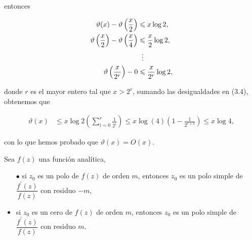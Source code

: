 entonces

\begin{equation}
    \begin{aligned}
 \vartheta(x)-\vartheta\left(\frac{x}{2}\right) &\leq x\log2, \\
 \vartheta\left(\frac{x}{2}\right) -\vartheta\left(\frac{x}{4}\right) &\leq \frac{x}{2}\log2,\\
 &\hspace*{0.191cm}\vdots \\
 \vartheta\left(\frac{x}{2^r}\right)-0 &\leq \frac{x}{2^r}\log 2,
\end{aligned}
\end{equation}

donde $r$ es el mayor entero tal que $x>2^r$, sumando las desigualdades en (3.4), obtenemos que

\begin{align*}
    \vartheta(x)&\leq x\log 2\left(\sum_{i=0}^{r} \frac{1}{2^{i}}\right)\leq x\log(4)\left(1-\frac{1}{2^{r+1}}\right)\leq x\log 4
,\end{align*}

con lo que hemos probado que $\vartheta(x)=O(x)$.\\

\begin{theorem}
    Sea $f(z)$ una función analítica, 

    \begin{itemize}
        \item[$\bullet$]si $z_0$ es un polo de $f(z)$ de orden $m$, entonces $z_0$ es un polo simple de $\dfrac{f^{\prime}(z)}{f(z)}$ con residuo $-m$,

        \item si $z_0$ es un cero de $f(z)$ de orden $m$, entonces $z_0$ es un polo simple de $\dfrac{f^{\prime}(z)}{f(z)}$ con residuo $m$.
    \end{itemize}
\end{theorem}

